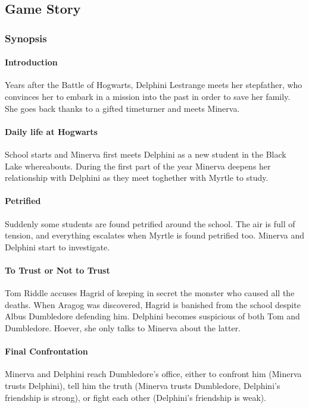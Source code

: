 \subsection*{Game Story}

\subsubsection*{Synopsis}

\paragraph{Introduction}
Years after the Battle of Hogwarts, Delphini Lestrange meets her stepfather, who convinces her to embark in a mission into the past in order to save her family. She goes back thanks to a gifted timeturner and meets Minerva.

\paragraph{Daily life at Hogwarts}
School starts and Minerva first meets Delphini as a new student in the Black Lake whereabouts. During the first part of the year Minerva deepens her relationship with Delphini as they meet toghether with Myrtle to study.

\paragraph{Petrified}
Suddenly some students are found petrified around the school. The air is full of tension, and everything escalates when Myrtle is found petrified too. Minerva and Delphini start to investigate.

\paragraph{To Trust or Not to Trust}
Tom Riddle accuses Hagrid of keeping in secret the monster who caused all the deaths. When Aragog was discovered, Hagrid is banished from the school despite Albus Dumbledore defending him. Delphini becomes suspicious of both Tom and Dumbledore. Hoever, she only talks to Minerva about the latter.

\paragraph{Final Confrontation}
Minerva and Delphini reach Dumbledore's office, either to confront him (Minerva trusts Delphini), tell him the truth (Minerva trusts Dumbledore, Delphini's friendship is strong), or fight each other (Delphini's friendship is weak).

